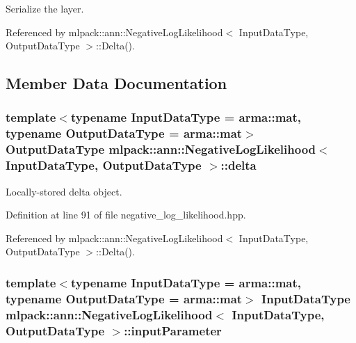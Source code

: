 Serialize the layer. 



Referenced by mlpack\+::ann\+::\+Negative\+Log\+Likelihood$<$ Input\+Data\+Type, Output\+Data\+Type $>$\+::\+Delta().



\subsection{Member Data Documentation}
\subsubsection[{delta}]{\setlength{\rightskip}{0pt plus 5cm}template$<$typename Input\+Data\+Type  = arma\+::mat, typename Output\+Data\+Type  = arma\+::mat$>$ Output\+Data\+Type {\bf mlpack\+::ann\+::\+Negative\+Log\+Likelihood}$<$ Input\+Data\+Type, Output\+Data\+Type $>$\+::delta\hspace{0.3cm}{\ttfamily [private]}}\label{classmlpack_1_1ann_1_1NegativeLogLikelihood_a307f5434590597f08ea74d01642438d4}


Locally-\/stored delta object. 



Definition at line 91 of file negative\+\_\+log\+\_\+likelihood.\+hpp.



Referenced by mlpack\+::ann\+::\+Negative\+Log\+Likelihood$<$ Input\+Data\+Type, Output\+Data\+Type $>$\+::\+Delta().

\subsubsection[{input\+Parameter}]{\setlength{\rightskip}{0pt plus 5cm}template$<$typename Input\+Data\+Type  = arma\+::mat, typename Output\+Data\+Type  = arma\+::mat$>$ Input\+Data\+Type {\bf mlpack\+::ann\+::\+Negative\+Log\+Likelihood}$<$ Input\+Data\+Type, Output\+Data\+Type $>$\+::input\+Parameter\hspace{0.3cm}{\ttfamily [private]}}\label{classmlpack_1_1ann_1_1NegativeLogLikelihood_a2f9689965d086e12b3e24006501b40d3}


